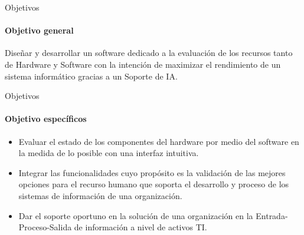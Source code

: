 \begin{frame}{Objetivos}
    \framesubtitle{Objetivo general}
    Diseñar y desarrollar un software dedicado a la evaluación de
    los recursos tanto de Hardware y Software con la intención de
    maximizar el rendimiento de un sistema informático gracias a un
    Soporte de IA.
\end{frame}
\begin{frame}{Objetivos}
    \framesubtitle{Objetivo específicos}
    \begin{itemize}
        \item Evaluar el estado de los componentes del hardware por medio del software en la medida de lo posible con una interfaz intuitiva.
        \item Integrar las funcionalidades cuyo propósito es la
        validación de las mejores opciones para el recurso humano que soporta el desarrollo y proceso de los sistemas de información de una organización.
        \item Dar el soporte oportuno en la solución de una
        organización en la Entrada-Proceso-Salida de información a
        nivel de activos TI.
    \end{itemize}
\end{frame}